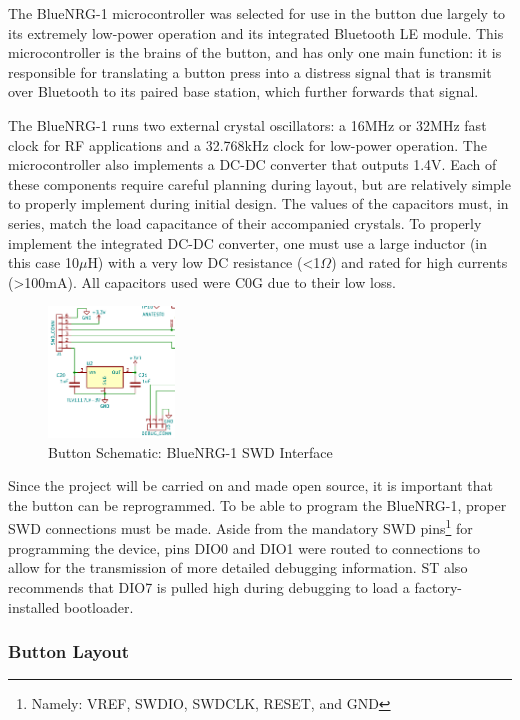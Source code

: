 \documentclass[journal,compsoc]{IEEEtran}
\begin{document}
The BlueNRG-1 microcontroller was selected for use in the button due largely to its extremely low-power operation and its integrated Bluetooth LE module.  This microcontroller is the brains of the button, and has only one main function: it is responsible for translating a button press into a distress signal that is transmit over Bluetooth to its paired base station, which further forwards that signal.

The BlueNRG-1 runs two external crystal oscillators: a 16MHz or 32MHz fast clock for RF applications and a 32.768kHz clock for low-power operation. The microcontroller also implements a DC-DC converter that outputs 1.4V. Each of these components require careful planning during layout, but are relatively simple to properly implement during initial design.  The values of the capacitors must, in series, match the load capacitance of their accompanied crystals.  To properly implement the integrated DC-DC converter, one must use a large inductor (in this case 10$\mu$H) with a very low DC resistance (<1$\Omega$) and rated for high currents (>100mA).  All capacitors used were C0G due to their low loss.

\begin{figure}[H]
\centering
\includegraphics[width=0.3\textwidth]{buttswd.PNG}
\caption{Button Schematic: BlueNRG-1 SWD Interface}
\label{buttswd}
\end{figure}

Since the project will be carried on and made open source, it is important that the button can be reprogrammed.  To be able to program the BlueNRG-1, proper SWD connections must be made.  Aside from the mandatory SWD pins\footnote{Namely: VREF, SWDIO, SWDCLK, RESET, and GND} for programming the device, pins DIO0 and DIO1 were routed to connections to allow for the transmission of more detailed debugging information. ST also recommends that DIO7 is pulled high during debugging to load a factory-installed bootloader.

\subsubsection{Button Layout}
\end{document}
